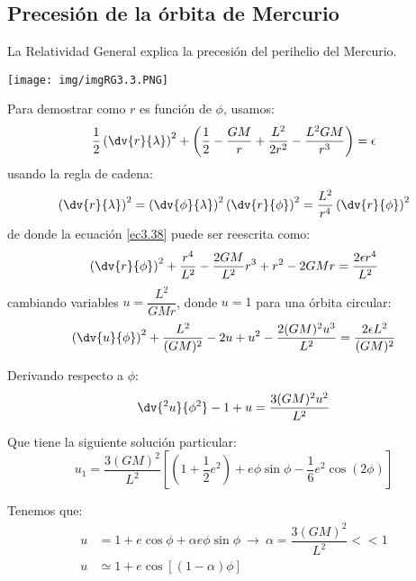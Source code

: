 \documentclass[../main]{subfiles}
\begin{document}
\begin{adjustwidth}{0pt}{-100pt}
\section{Precesión de la órbita de Mercurio}\label{part3.8}

La Relatividad General explica la precesión del perihelio del Mercurio.
\begin{center}
    \texttt{[image: img/imgRG3.3.PNG]}
\end{center}

Para demostrar como $r$ es función de $\phi$, usamos:
\begin{equation}
    \dfrac{1}{2}\left(\dv{r}{\lambda}\right)^2+\left(\dfrac{1}{2}-\dfrac{GM}{r}+\dfrac{L^2}{2r^2}-\dfrac{L^2 GM}{r^3}\right)=\epsilon
    \label{ec3.38}
\end{equation}
usando la regla de cadena:
\begin{equation}
    \left(\dv{r}{\lambda}\right)^2=\left(\dv{\phi}{\lambda}\right)^2\left(\dv{r}{\phi}\right)^2=\dfrac{L^2}{r^4}\left(\dv{r}{\phi}\right)^2
\end{equation}
de donde la ecuación \eqref{ec3.38} puede ser reescrita como:
\begin{equation}
    \left(\dv{r}{\phi}\right)^2+\dfrac{r^4}{L^2}-\dfrac{2GM}{L^2}r^3+r^2-2GMr=\dfrac{2\epsilon r^4}{L^2}
\end{equation}
cambiando variables $u=\dfrac{L^2}{GMr}$, donde $u=1$ para una órbita circular:
\begin{equation}
    \left(\dv{u}{\phi}\right)^2+\dfrac{L^2}{(GM)^2}-2u+u^2-\dfrac{2(GM)^2 u^3}{L^2}=\dfrac{2\epsilon L^2}{(GM)^2}
\end{equation}

Derivando respecto a $\phi$:
\begin{equation}
    \dv{^2 u}{\phi^2}-1+u=\dfrac{3(GM)^2 u^2}{L^2}
\end{equation}

Que tiene la siguiente solución particular:
\begin{equation}
    u_1=\dfrac{3(GM)^2}{L^2}\left[\left(1+\dfrac{1}{2}e^2\right)+e\phi\sin \phi-\dfrac{1}{6}e^2\cos(2\phi)\right]
\end{equation}

Tenemos que:
\begin{equation}
    \begin{aligned}
        u&=1+e\cos \phi+\alpha e\phi \sin\phi \ \rightarrow \ \alpha=\dfrac{3(GM)^2}{L^2}<<1\\
        u&\simeq 1+e\cos\left[(1-\alpha)\phi\right]
    \end{aligned}
\end{equation}


\end{adjustwidth}
\end{document}
